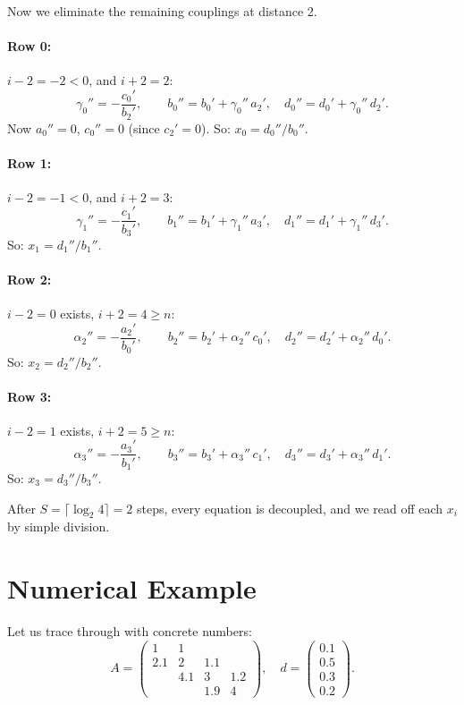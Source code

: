 \documentclass[11pt]{article}
\begin{document}
Now we eliminate the remaining couplings at distance 2.

\paragraph{Row 0:} $i - 2 = -2 < 0$, and $i + 2 = 2$:
\[
\gamma_0'' = -\frac{c_0'}{b_2'}, \qquad
b_0'' = b_0' + \gamma_0'' \, a_2', \quad
d_0'' = d_0' + \gamma_0'' \, d_2'.
\]
Now $a_0'' = 0$, $c_0'' = 0$ (since $c_2' = 0$). So: $x_0 = d_0'' / b_0''$.

\paragraph{Row 1:} $i - 2 = -1 < 0$, and $i + 2 = 3$:
\[
\gamma_1'' = -\frac{c_1'}{b_3'}, \qquad
b_1'' = b_1' + \gamma_1'' \, a_3', \quad
d_1'' = d_1' + \gamma_1'' \, d_3'.
\]
So: $x_1 = d_1'' / b_1''$.

\paragraph{Row 2:} $i - 2 = 0$ exists, $i + 2 = 4 \geq n$:
\[
\alpha_2'' = -\frac{a_2'}{b_0'}, \qquad
b_2'' = b_2' + \alpha_2'' \, c_0', \quad
d_2'' = d_2' + \alpha_2'' \, d_0'.
\]
So: $x_2 = d_2'' / b_2''$.

\paragraph{Row 3:} $i - 2 = 1$ exists, $i + 2 = 5 \geq n$:
\[
\alpha_3'' = -\frac{a_3'}{b_1'}, \qquad
b_3'' = b_3' + \alpha_3'' \, c_1', \quad
d_3'' = d_3' + \alpha_3'' \, d_1'.
\]
So: $x_3 = d_3'' / b_3''$.

After $S = \lceil \log_2 4 \rceil = 2$ steps, every equation is decoupled, and we
read off each $x_i$ by simple division.

\section{Numerical Example}

Let us trace through with concrete numbers:
\[
A = \begin{pmatrix}
1 & 1 \\
2.1 & 2 & 1.1 \\
 & 4.1 & 3 & 1.2 \\
 & & 1.9 & 4
\end{pmatrix}, \quad
d = \begin{pmatrix} 0.1 \\ 0.5 \\ 0.3 \\ 0.2 \end{pmatrix}.
\]
\end{document}
